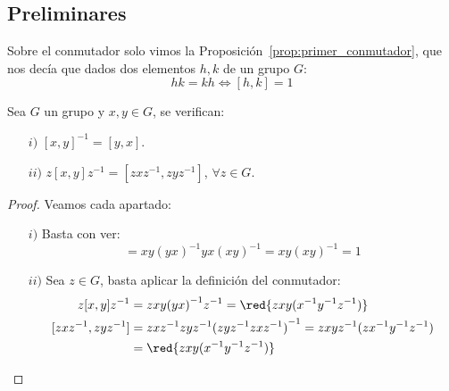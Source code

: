\subsection{Preliminares}
\noindent
Sobre el conmutador solo vimos la Proposición~\ref{prop:primer_conmutador}, que nos decía que dados dos elementos $h,k$ de un grupo $G$:
\begin{equation*}
    hk = kh \Longleftrightarrow [h,k] = 1
\end{equation*}

\begin{prop}\label{prop:props_conmutador}
    Sea $G$ un grupo y $x,y\in G$, se verifican:
    \begin{itemize}
        \item[$i)$] ${[x,y]}^{-1} = [y,x]$.
        \item[$ii)$] $z[x,y]z^{-1} = [zxz^{-1}, zyz^{-1}]$, $\forall z\in G$.
    \end{itemize}
    \begin{proof}
        Veamos cada apartado:
        \begin{enumerate}
            \item[$i)$] Basta con ver:
                \begin{equation*}
                    [x,y][y,x] = xy{(yx)}^{-1}yx{(xy)}^{-1} = xy{(xy)}^{-1} = 1
                \end{equation*}
            \item[$ii)$] Sea $z\in G$, basta aplicar la definición del conmutador:
                \begin{align*}
                    z[x,y]z^{-1} &= zxy{(yx)}^{-1}z^{-1} = \red{zxy(x^{-1}y^{-1}z^{-1})}  \\
                    [zxz^{-1}, zyz^{-1}] &= zxz^{-1}zyz^{-1} {(zyz^{-1}zxz^{-1})}^{-1} = zxyz^{-1}(zx^{-1}y^{-1}z^{-1}) \\ &= \red{zxy (x^{-1}y^{-1}z^{-1})}
                \end{align*} \qedhere
        \end{enumerate}
    \end{proof}
\end{prop}

